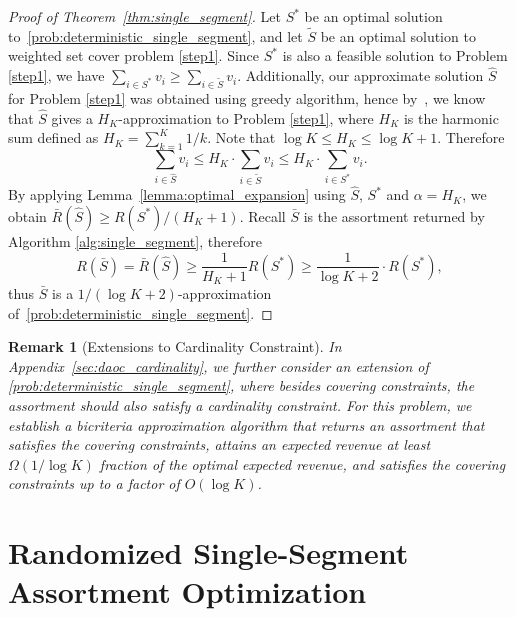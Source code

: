 \documentclass[msom,non-blindrev]{informs3} %
\newtheorem{remark}[theorem]{Remark}
\theoremstyle{definition}
\begin{document}
\begin{proof}[Proof of Theorem~\ref{thm:single_segment}]
Let $S^*$ be an  optimal solution to~\eqref{prob:deterministic_single_segment}, and let  $\tilde{S}$ be an optimal solution to weighted set cover problem \eqref{step1}. Since $S^*$ is also a feasible solution to Problem \eqref{step1}, we have $\sum_{i\in S^*} v_i\geq \sum_{i\in\tilde{S}}v_i$. Additionally, our approximate solution $\hat{S}$ for Problem \eqref{step1} was obtained using greedy algorithm, hence by~\cite{lovasz1975ratio}, we know that $\hat{S}$ gives a $H_K$-approximation to Problem \eqref{step1}, where $H_K$ is the harmonic sum defined as $H_K=\sum_{k=1}^K 1/k$. Note that  $\log K \leq H_K \leq \log K +1$. Therefore
\begin{equation*}
\sum_{i\in\hat{S}}v_i\leq H_K\cdot \sum_{i\in \tilde{S}}v_i\leq H_K\cdot \sum_{i\in S^*}v_i.
\end{equation*}
By applying Lemma~\ref{lemma:optimal_expansion} using $\hat{S}$, $S^*$ and $\alpha= H_K$, we obtain
$    \bar{R}(\hat{S}) \geq   {R}(S^*)  /(H_K+1)  $. Recall $\bar{S}$ is the assortment returned by Algorithm \ref{alg:single_segment}, therefore
\begin{equation*}
R(\bar{S}) = \bar{R}(\hat{S})    \geq \dfrac{1}{H_K+1}R(S^*)\geq\dfrac{1}{\log K+2}\cdot R(S^*),
\end{equation*}
thus $\bar{S}$ is a $1/(\log K+2)$-approximation of~\eqref{prob:deterministic_single_segment}.
\end{proof}

{  
\begin{remark}[Extensions to Cardinality Constraint]
In Appendix~\ref{sec:daoc_cardinality}, we further consider an extension of \eqref{prob:deterministic_single_segment}, where besides covering constraints, the assortment should also satisfy a cardinality constraint. For this problem, we establish a bicriteria approximation algorithm that returns an assortment that satisfies the covering constraints, attains an expected revenue at least $\Omega(1/\log K)$ fraction of the optimal expected revenue, and satisfies the covering constraints up to a factor of $O(\log K)$.
\end{remark}
}

\section{Randomized Single-Segment Assortment Optimization}\label{sec:randomized_setting}
\end{document}
